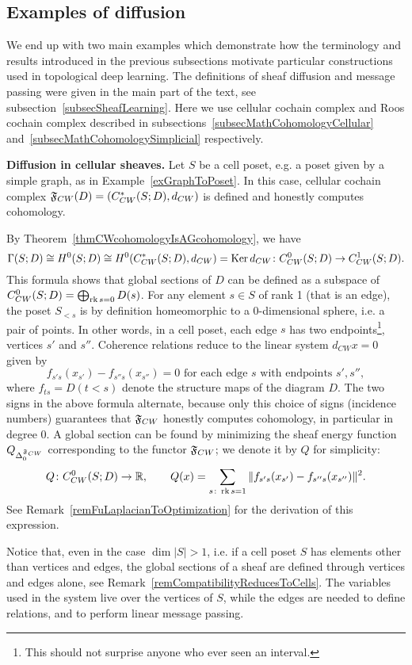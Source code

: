 \subsection{Examples of diffusion}\label{subsecMathDiffuseExamples}

We end up with two main examples which demonstrate how the terminology and results introduced in the previous subsections motivate particular constructions used in topological deep learning. The definitions of sheaf diffusion and message passing were given in the main part of the text, see subsection~\ref{subsecSheafLearning}. Here we use cellular cochain complex and Roos cochain complex described in subsections~\ref{subsecMathCohomologyCellular} and~\ref{subsecMathCohomologySimplicial} respectively.

\textbf{Diffusion in cellular sheaves.} Let $S$ be a cell poset, e.g. a poset given by a simple graph, as in Example~\ref{exGraphToPoset}. In this case, cellular cochain complex $\mathfrak{F}_{CW}(D)=(C^*_{CW}(S;D),d_{CW})$ is defined and honestly computes cohomology.

\begin{con}\label{conCellComplexDiffusion}
By Theorem~\ref{thmCWcohomologyIsAGcohomology}, we have
\[
\Gamma(S;D)\cong H^0(S;D)\cong H^0(C^*_{CW}(S;D),d_{CW})=\operatorname{Ker} d_{CW}\colon C^0_{CW}(S;D)\to C^1_{CW}(S;D).
\]
This formula shows that global sections of $D$ can be defined as a subspace of $C^0_{CW}(S;D)=\bigoplus_{\operatorname{rk} s=0}D(s)$. For any element $s\in S$ of rank 1 (that is an edge), the poset $S_{<s}$ is by definition homeomorphic to a $0$-dimensional sphere, i.e. a pair of points. In other words, in a cell poset, each edge $s$ has two endpoints\footnote{This should not surprise anyone who ever seen an interval.}, vertices $s'$ and $s''$. Coherence relations reduce to the linear system $d_{CW}x=0$ given by
\[
f_{s's}(x_{s'})-f_{s''s}(x_{s''})=0 \mbox{ for each edge }s\mbox{ with endpoints }s',s'',
\] 
where $f_{ts}=D(t<s)$ denote the structure maps of the diagram $D$. The two signs in the above formula alternate, because only this choice of signs (incidence numbers) guarantees that $\mathfrak{F}_{CW}$ honestly computes cohomology, in particular in degree 0. A global section can be found by minimizing the sheaf energy function $Q_{\Delta_0^{\mathfrak{F}_{CW}}}$ corresponding to the functor $\mathfrak{F}_{CW}$; we denote it by $Q$ for simplicity:
\[
Q\colon C^0_{CW}(S;D)\to \mathbb{R},\qquad Q(x)=\sum_{s\colon \operatorname{rk} s=1}\|f_{s's}(x_{s'})-f_{s''s}(x_{s''})\|^2.
\]
See Remark~\ref{remFuLaplacianToOptimization} for the derivation of this expression. 

Notice that, even in the case $\dim |S|>1$, i.e. if a cell poset $S$ has elements other than vertices and edges, the global sections of a sheaf are defined through vertices and edges alone, see Remark~\ref{remCompatibilityReducesToCells}. The variables used in the system live over the vertices of $S$, while the edges are needed to define relations, and to perform linear message passing. 
\end{con}

